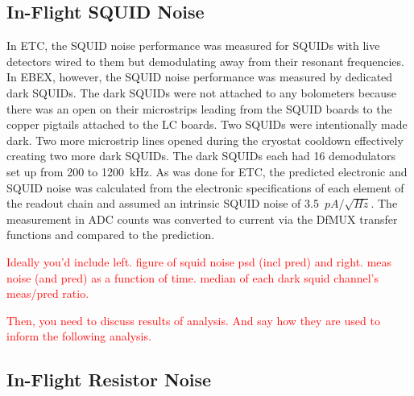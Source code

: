 

\subsection{In-Flight SQUID Noise}
\label{sec:flight_squid_noise}

In \ac{ETC}, the \ac{SQUID} noise performance was measured for \ac{SQUID}s with live detectors wired to them but demodulating away from their resonant frequencies. 
In \ac{EBEX}, however, the \ac{SQUID} noise performance was measured by dedicated dark \ac{SQUID}s. 
The dark \ac{SQUID}s were not attached to any bolometers because there was an open on their microstrips leading from the \ac{SQUID} boards to the copper pigtails attached to the \ac{LC} boards. 
Two \ac{SQUID}s were intentionally made dark. 
Two more microstrip lines opened during the cryostat cooldown effectively creating two more dark \ac{SQUID}s. 
The dark \ac{SQUID}s each had 16 demodulators set up from 200 to 1200~kHz.
As was done for \ac{ETC}, the predicted electronic and \ac{SQUID} noise was calculated from the electronic specifications of each element of the readout chain and assumed an intrinsic \ac{SQUID} noise of 3.5~$pA/\sqrt{Hz}$. 
The measurement in \ac{ADC} counts was converted to current via the \ac{DfMUX} transfer functions and compared to the prediction. 



\textcolor{red}{
Ideally you'd include
left. figure of squid noise psd (incl pred) and right. meas noise (and pred) as a function of time.
median of each dark squid channel's meas/pred ratio.
}

\textcolor{red}{Then, you need to discuss results of analysis. And say how they are used to inform the following analysis.}

\subsection{In-Flight Resistor Noise}
\label{sec:flight_resistor_noise}

